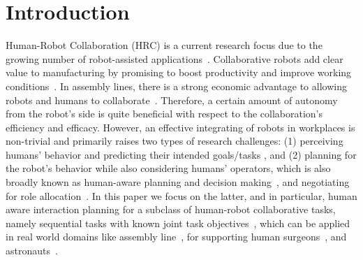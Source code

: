 \documentclass[letterpaper]{article} %
\begin{document}
\section{Introduction}
Human-Robot Collaboration (HRC) is a current research focus due to the growing number of robot-assisted applications~\cite{kragic2021effective,selvaggio2021autonomy}. Collaborative robots add clear value to manufacturing by promising to boost productivity and improve working conditions~\cite{johannsmeier2016hierarchical}. In assembly lines, there is a strong economic advantage to allowing robots and humans to collaborate~\cite{nikolaidis2012human,coupete2015gesture}. Therefore, a certain amount of autonomy from the robot's side is quite beneficial with respect to the collaboration's efficiency and efficacy.  
However, an effective integrating of robots in workplaces is non-trivial and primarily raises two types of research challenges: (1) perceiving humans' behavior and predicting their intended goals/tasks \cite{cheng2020towards,cheng2019human}, and (2) planning for the robot's behavior while also considering humans' operators, which is also broadly known as human-aware planning and decision making~\cite{CirilloKS09,alami2006toward,de2015hatp,CramerKD21,UnhelkarLS20}, and negotiating for role allocation~\cite{roncone2017transparent}. 
In this paper we focus on the latter, and in particular, human aware interaction planning for a subclass of human-robot collaborative tasks, namely sequential tasks with known joint task objectives~\cite{cheng2021human,UnhelkarLS19,buisan:hal-03684211}, which can be applied in real world domains like assembly line~\cite{unhelkar2018human}, for supporting human surgeons~\cite{jacob2013collaboration}, and astronauts~\cite{diftler2011robonaut}. 
\end{document}
